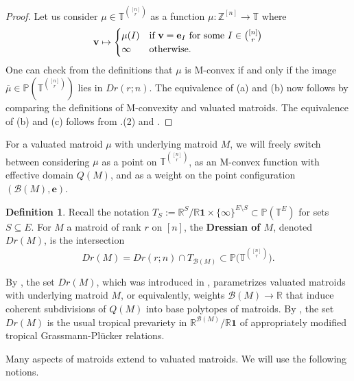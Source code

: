 \documentclass[11pt]{amsart}
\newcommand{\RR}{\mathbb R}
\newcommand{\PP}{\mathbb P}
\newcommand{\ZZ}{\mathbb Z}
\newcommand{\TT}{\mathbb T}
\newcommand{\be}{\mathbf e}
\newcommand{\bv}{{\mathbf v}}
\theoremstyle{definition}
\newtheorem{defn}[thm]{Definition}
\begin{document}
\begin{proof}
Let us consider $\mu\in\TT^{\binom{[n]}{r}}$ as a function $\mu: \ZZ^{[n]} \to \TT$ where
\[
\bv \mapsto \begin{cases} \mu(I) & \textnormal{if } \bv = \be_I \textnormal{ for some }I\in \binom{[n]}{r}\\
\infty & \textnormal{otherwise}.
\end{cases}
\]
One can check from the definitions that $\mu$ is M-convex if and only if the image $\overline\mu \in \PP(\TT^{\binom{[n]}{r}})$ lies in $Dr(r;n)$.  The equivalence of (a) and (b) now follows by comparing the definitions of M-convexity and valuated matroids.  The equivalence of (b) and (c) follows from .(2) and .
\end{proof}

For a valuated matroid $\mu$ with underlying matroid $M$, we will freely switch between considering $\mu$ as a point on $\TT^{\binom{[n]}{r}}$, as an M-convex function with effective domain $Q(M)$, and as a weight on the point configuration $(\mathcal B(M),\be)$.

\begin{defn}
Recall the notation $T_S := \RR^S/\RR\mathbf 1 \times \{\infty\}^{E\setminus S} \subset \PP(\TT^E)$ for sets $S\subseteq E$.  For $M$ a matroid of rank $r$ on $[n]$, the \textbf{Dressian of $M$}, denoted $Dr(M)$, is the intersection
\[
Dr(M) = Dr(r;n) \cap T_{\mathcal B(M)} \subset \PP\big(\TT^{\binom{[n]}{r}}\big).
\]
\end{defn}

By , the set $Dr(M)$, which was introduced in \cite{tropplanes}, parametrizes valuated matroids with underlying matroid $M$, or equivalently, weights $\mathcal B(M)\to \RR$ that induce coherent subdivisions of $Q(M)$ into base polytopes of matroids.  By , the set $Dr(M)$ is the usual tropical prevariety in $\RR^{\mathcal B(M)}/\RR\mathbf 1$ of appropriately modified tropical Grassmann-Pl\"ucker relations.

\medskip
Many aspects of matroids extend to valuated matroids.  We will use the following notions.
\end{document}
